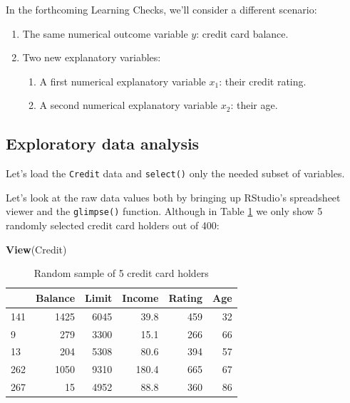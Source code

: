 \documentclass[12pt,]{krantz}
\makeatletter
\newenvironment{Shaded}{\begin{snugshade}}{\end{snugshade}}
\newcommand{\KeywordTok}[1]{\textcolor[rgb]{0.27,0.27,0.27}{\textbf{#1}}}
\newcommand{\StringTok}[1]{\textcolor[rgb]{0.5,0.5,0.5}{#1}}
\newcommand{\OperatorTok}[1]{\textcolor[rgb]{0.43,0.43,0.43}{\textbf{#1}}}
\newcommand{\NormalTok}[1]{#1}
\providecommand{\tightlist}{%
  \setlength{\itemsep}{0pt}\setlength{\parskip}{0pt}}
\newenvironment{kframe}{%
\medskip{}
\setlength{\fboxsep}{.8em}
 \def\at@end@of@kframe{}%
 \ifinner\ifhmode%
  \def\at@end@of@kframe{\end{minipage}}%
  \begin{minipage}{\columnwidth}%
 \fi\fi%
 \def\FrameCommand##1{\hskip\@totalleftmargin \hskip-\fboxsep
 \colorbox{shadecolor}{##1}\hskip-\fboxsep
     \hskip-\linewidth \hskip-\@totalleftmargin \hskip\columnwidth}%
 \MakeFramed {\advance\hsize-\width
   \@totalleftmargin\z@ \linewidth\hsize
   \@setminipage}}%
 {\par\unskip\endMakeFramed%
 \at@end@of@kframe}
\renewenvironment{Shaded}{\begin{kframe}}{\end{kframe}}
\theoremstyle{definition}
\theoremstyle{definition}
\theoremstyle{definition}
\theoremstyle{remark}
\makeatother
\begin{document}
In the forthcoming Learning Checks, we'll consider a different scenario:

\begin{enumerate}
\def\labelenumi{\arabic{enumi}.}
\tightlist
\item
  The same numerical outcome variable \(y\): credit card balance.
\item
  Two new explanatory variables:

  \begin{enumerate}
  \def\labelenumii{\arabic{enumii}.}
  \tightlist
  \item
    A first numerical explanatory variable \(x_1\): their credit rating.
  \item
    A second numerical explanatory variable \(x_2\): their age.
  \end{enumerate}
\end{enumerate}

\subsection{Exploratory data analysis}\label{model3EDA}

Let's load the \texttt{Credit} data and \texttt{select()} only the
needed subset of variables.

\begin{Shaded}
\end{Shaded}

Let's look at the raw data values both by bringing up RStudio's
spreadsheet viewer and the \texttt{glimpse()} function. Although in
Table \ref{tab:model3-data-preview} we only show 5 randomly selected
credit card holders out of 400:

\begin{Shaded}
\begin{Highlighting}[]
\KeywordTok{View}\NormalTok{(Credit)}
\end{Highlighting}
\end{Shaded}

\begin{table}[H]

\caption{\label{tab:model3-data-preview}Random sample of 5 credit card holders}
\centering
\fontsize{10}{12}\selectfont
\begin{tabular}[t]{lrrrrr}
\toprule
  & Balance & Limit & Income & Rating & Age\\
\midrule
141 & 1425 & 6045 & 39.8 & 459 & 32\\
9 & 279 & 3300 & 15.1 & 266 & 66\\
13 & 204 & 5308 & 80.6 & 394 & 57\\
262 & 1050 & 9310 & 180.4 & 665 & 67\\
267 & 15 & 4952 & 88.8 & 360 & 86\\
\bottomrule
\end{tabular}
\end{table}
\end{document}
